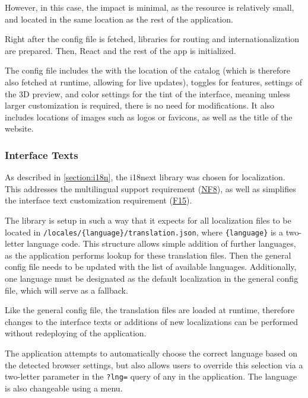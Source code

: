 However, in this case, the impact is minimal, as the resource is relatively small, and located in the same location as the rest of the application.

Right after the config file is fetched, libraries for routing and internationalization are prepared. Then, React and the rest of the app is initialized. 

The config file includes the  with the location of the catalog (which is therefore also fetched at runtime, allowing for live updates), toggles for features, settings of the 3D preview, and color settings for the tint of the interface, meaning unless larger customization is required, there is no need for  modifications. It also includes locations of images such as logos or favicons, as well as the title of the website.


\subsubsection{Interface Texts} \label{section:impl-languages}

As described in \autoref{section:i18n}, the i18next library was chosen for localization. This addresses the multilingual support requirement (\hyperref[itm:NF8]{NF8}), as well as simplifies the interface text customization requirement (\hyperref[itm:F15]{F15}).

The library is setup in such a way that it expects for all localization files to be located in \texttt{/locales/\{language\}/translation.json}, where \texttt{\{language\}} is a two-letter language code. This structure allows simple addition of further languages, as the application performs lookup for these translation files. Then the general config file needs to be updated with the list of available languages. Additionally, one language must be designated as the default localization in the general config file, which will serve as a fallback.

Like the general config file, the translation files are loaded at runtime, therefore changes to the interface texts or additions of new localizations can be performed without redeploying of the application.

The application attempts to automatically choose the correct language based on the detected browser settings, but also allows users to override this selection via a two-letter parameter in the \texttt{?lng=} query of any  in the application. The language is also changeable using a menu.

